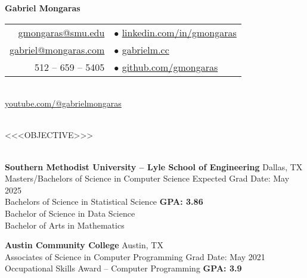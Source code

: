 \documentclass[a4paper,10pt]{article}
\begin{document}
\begin{center}
    {\LARGE \textbf{Gabriel Mongaras}} \\
    \vspace{10pt}
    \begin{tabular}{r l}
        \href{mailto:gmongaras@smu.edu}{gmongaras@smu.edu} \quad & $\bullet$ \quad \href{https://www.linkedin.com/in/gmongaras}{linkedin.com/in/gmongaras} \\
        \href{mailto:gabriel@mongaras.com}{gabriel@mongaras.com} \quad & $\bullet$ \quad \href{https://gabrielm.cc/}{gabrielm.cc} \\
        512 – 659 – 5405 \quad & $\bullet$ \quad \href{https://github.com/gmongaras}{github.com/gmongaras} \\
    \end{tabular} \\
    \href{https://www.youtube.com/@gabrielmongaras}{youtube.com/@gabrielmongaras} \\
\end{center}

\noindent\hrulefill

 \vspace{1pt} \\
<<<OBJECTIVE>>>

\vspace{5pt}
 \vspace{1pt} \\
\textbf{Southern Methodist University – Lyle School of Engineering} \hfill Dallas, TX \\
Masters/Bachelors of Science in Computer Science \hfill Expected Grad Date: May 2025 \\
Bachelors of Science in Statistical Science \hfill \textbf{GPA: 3.86} \\
Bachelor of Science in Data Science \\
Bachelor of Arts in Mathematics

\vspace{5pt}
\noindent\textbf{Austin Community College} \hfill Austin, TX \\
Associates of Science in Computer Programming \hfill Grad Date: May 2021 \\
Occupational Skills Award – Computer Programming \hfill \textbf{GPA: 3.9}
\end{document}
